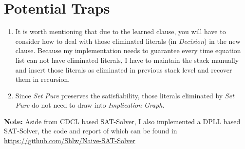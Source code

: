 \documentclass[a4paper,10pt]{article}
\begin{document}
\section{Potential Traps}
\begin{enumerate}
\setlength{\itemsep}{.1em}
\item It is worth mentioning that due to the learned clause, you will have to consider how to deal with those eliminated literals (in \textit{Decision}) in the new clause. Because my implementation needs to guarantee every time equation list can not have eliminated literals, I have to maintain the stack manually and insert those literals as eliminated in previous stack level and recover them in recursion.
\item Since \textit{Set Pure} preserves the satisfiability, those literals eliminated by \textit{Set Pure} do not need to draw into \textit{Implication Graph}.
\end{enumerate}
\textbf{Note:} Aside from CDCL based SAT-Solver, I also implemented a DPLL based SAT-Solver, the code and report of which can be found in \url{https://github.com/Shlw/Naive-SAT-Solver}
\end{document}
